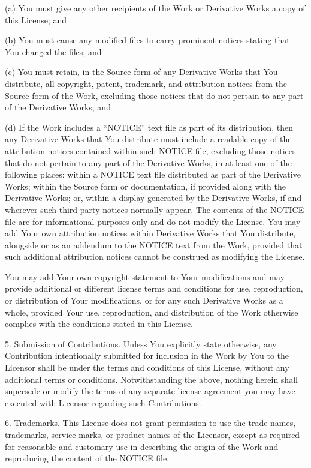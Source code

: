 \documentclass[letterpaper,10pt,english]{sphinxmanual}
\begin{document}
(a) You must give any other recipients of the Work or
Derivative Works a copy of this License; and

(b) You must cause any modified files to carry prominent notices
stating that You changed the files; and

(c) You must retain, in the Source form of any Derivative Works
that You distribute, all copyright, patent, trademark, and
attribution notices from the Source form of the Work,
excluding those notices that do not pertain to any part of
the Derivative Works; and

(d) If the Work includes a “NOTICE” text file as part of its
distribution, then any Derivative Works that You distribute must
include a readable copy of the attribution notices contained
within such NOTICE file, excluding those notices that do not
pertain to any part of the Derivative Works, in at least one
of the following places: within a NOTICE text file distributed
as part of the Derivative Works; within the Source form or
documentation, if provided along with the Derivative Works; or,
within a display generated by the Derivative Works, if and
wherever such third-party notices normally appear. The contents
of the NOTICE file are for informational purposes only and
do not modify the License. You may add Your own attribution
notices within Derivative Works that You distribute, alongside
or as an addendum to the NOTICE text from the Work, provided
that such additional attribution notices cannot be construed
as modifying the License.

You may add Your own copyright statement to Your modifications and
may provide additional or different license terms and conditions
for use, reproduction, or distribution of Your modifications, or
for any such Derivative Works as a whole, provided Your use,
reproduction, and distribution of the Work otherwise complies with
the conditions stated in this License.

5. Submission of Contributions. Unless You explicitly state otherwise,
any Contribution intentionally submitted for inclusion in the Work
by You to the Licensor shall be under the terms and conditions of
this License, without any additional terms or conditions.
Notwithstanding the above, nothing herein shall supersede or modify
the terms of any separate license agreement you may have executed
with Licensor regarding such Contributions.

6. Trademarks. This License does not grant permission to use the trade
names, trademarks, service marks, or product names of the Licensor,
except as required for reasonable and customary use in describing the
origin of the Work and reproducing the content of the NOTICE file.
\end{document}
